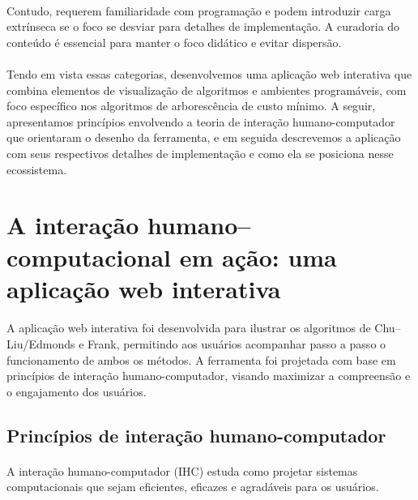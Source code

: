\documentclass[12pt,a4paper]{article}
\begin{document}
\paragraph{}
Contudo, requerem familiaridade com programação e podem introduzir carga extrínseca se o foco se desviar para detalhes de implementação. A curadoria do conteúdo é essencial para manter o foco didático e evitar dispersão.

\paragraph{}
Tendo em vista essas categorias, desenvolvemos uma aplicação web interativa que combina elementos de visualização de algoritmos e ambientes programáveis, com foco específico nos algoritmos de arborescência de custo mínimo. A seguir, apresentamos princípios envolvendo a teoria de interação humano-computador que orientaram o desenho da ferramenta, e em seguida descrevemos a aplicação com seus respectivos detalhes de implementação e como ela se posiciona nesse ecossistema.


\section{A interação humano--computacional em ação: uma aplicação web interativa}

\paragraph{}
A aplicação web interativa foi desenvolvida para ilustrar os algoritmos de Chu–Liu/Edmonds e Frank, permitindo aos usuários acompanhar passo a passo o funcionamento de ambos os métodos. A ferramenta foi projetada com base em princípios de interação humano-computador, visando maximizar a compreensão e o engajamento dos usuários.

\subsection{Princípios de interação humano-computador}

\paragraph{}
A interação humano-computador (IHC) estuda como projetar sistemas computacionais que sejam eficientes, eficazes e agradáveis para os usuários. 
\end{document}

